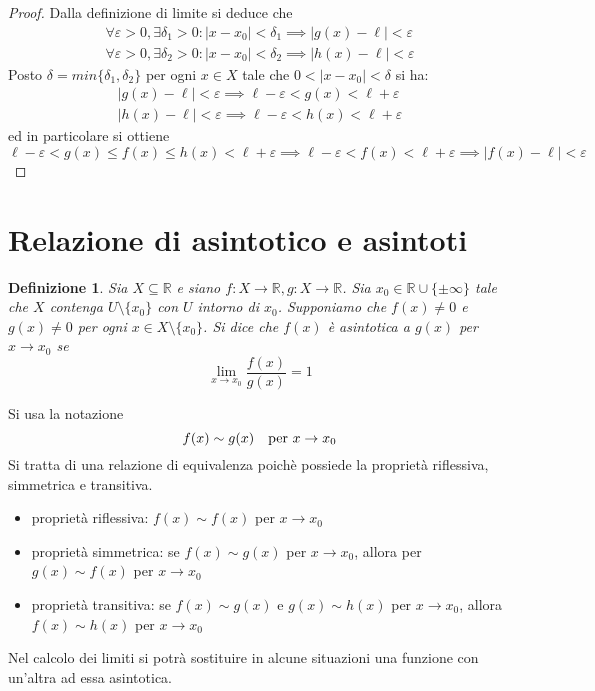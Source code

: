\documentclass[11pt]{book}
\newtheorem{definition}{Definizione}[chapter]
\begin{document}
\begin{proof}
    Dalla definizione di limite si deduce che 
    \begin{align*}
        \forall\varepsilon>0,\exists\delta_1>0:|x-x_0|<\delta_1\implies|g(x)-\ell|<\varepsilon\\
        \forall\varepsilon>0,\exists\delta_2>0:|x-x_0|<\delta_2\implies|h(x)-\ell|<\varepsilon
    \end{align*}
    Posto $\delta=min\{\delta_1,\delta_2\}$ per ogni $x\in X$ tale che $0<|x-x_0|<\delta$ si ha:
    \begin{align*}
        |g(x)-\ell|<\varepsilon\implies \ell-\varepsilon<g(x)<\ell+\varepsilon\\
        |h(x)-\ell|<\varepsilon\implies \ell-\varepsilon<h(x)<\ell+\varepsilon
    \end{align*}
    ed in particolare si ottiene
    \begin{equation*}
        \ell-\varepsilon<g(x)\leq f(x)\leq h(x)<\ell+\varepsilon\implies\ell-\varepsilon<f(x)<\ell+\varepsilon\implies|f(x)-\ell|<\varepsilon
    \end{equation*}
\end{proof}
\section{Relazione di asintotico e asintoti}
\begin{definition}
    Sia $X\subseteq\mathbb{R}$ e siano $f:X\rightarrow\mathbb{R},g:X\rightarrow\mathbb{R}$. Sia $x_0\in\mathbb{R}\cup\{\pm\infty\}$
    tale che $X$ contenga $U\setminus\{x_0\}$ con $U$ intorno di $x_0$. Supponiamo che $f(x)\neq 0$ e $g(x)\neq 0$ per 
    ogni $x\in X\setminus\{x_0\}$. Si dice che $f(x)$ è asintotica a $g(x)$ per $x\rightarrow x_0$ se 
    \begin{equation*}
        \lim_{x\rightarrow x_0} \frac{f(x)}{g(x)}=1
    \end{equation*}
\end{definition}
Si usa la notazione
\begin{equation*}
    f(x)\sim g(x)\quad\textnormal{per } x\rightarrow x_0
\end{equation*}
Si tratta di una relazione di equivalenza poichè possiede la proprietà riflessiva, simmetrica e transitiva.
\begin{itemize}
    \item proprietà riflessiva: $f(x)\sim f(x)$ per $x\rightarrow x_0$
    \item proprietà simmetrica: se $f(x)\sim g(x)$ per $x\rightarrow x_0$, allora per $g(x)\sim f(x)$ per $x\rightarrow x_0$
    \item proprietà transitiva: se $f(x)\sim g(x)$ e $g(x)\sim h(x)$ per $x\rightarrow x_0$, allora  $f(x)\sim h(x)$ per $x\rightarrow x_0$
\end{itemize}
Nel calcolo dei limiti si potrà sostituire in alcune situazioni una funzione con un'altra ad essa asintotica.
\end{document}
